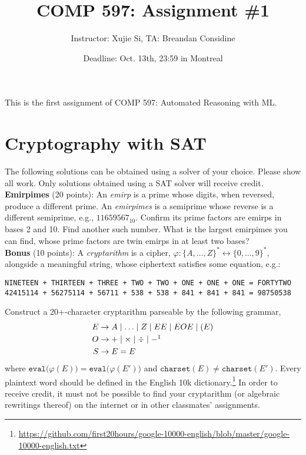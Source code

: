 \documentclass[11pt]{article}
\author{Instructor: Xujie Si, TA: Breandan Considine}
\date{Deadline: Oct. 13th, 23:59 in Montreal}
\title{COMP 597: Assignment \#1}
\begin{document}
    \maketitle
    \noindent This is the first assignment of COMP 597: Automated Reasoning with ML.

    \section{Cryptography with SAT}

    The following solutions can be obtained using a solver of your choice. Please show all work. Only solutions obtained using a SAT solver will receive credit.\\

    \noindent \textbf{Emirpimes} (20 points): An \textit{emirp} is a prime whose digits, when reversed, produce a different prime. An \textit{emirpimes} is a semiprime whose reverse is a different semiprime, e.g., $11659567_{10}$. Confirm its prime factors are emirps in bases 2 and 10. Find another such number. What is the largest emirpimes you can find, whose prime factors are twin emirps in at least two bases?\\

    \noindent \textbf{Bonus} (10 points): A \textit{cryptarithm} is a cipher, $\varphi: \{A,\ldots, Z\}^*\leftrightarrow \{0, \ldots, 9\}^*$, alongside a meaningful string, whose ciphertext satisfies some equation, e.g.:

    \begin{lstlisting}[basicstyle=\scriptsize\ttfamily]
NINETEEN + THIRTEEN + THREE + TWO + TWO + ONE + ONE + ONE = FORTYTWO
42415114 + 56275114 + 56711 + 538 + 538 + 841 + 841 + 841 = 98750538
    \end{lstlisting}

    \noindent Construct a 20+-character cryptarithm parseable by the following grammar,
    \begin{align*}
E &\rightarrow A \mid \ldots \mid Z \mid EE \mid E O E \mid ( E )\\
O &\rightarrow + \mid \times \mid \div \mid -\footnotemark\\
S &\rightarrow E = E
    \end{align*}
    \noindent where $\texttt{eval}\big(\varphi(E)\big) = \texttt{eval}\big(\varphi(E')\big)$ and $\texttt{charset}(E) \neq \texttt{charset}(E')$. Every plaintext word should be defined in the English 10k dictionary.\footnote{\tiny\url{https://github.com/first20hours/google-10000-english/blob/master/google-10000-english.txt}} In order to receive credit, it must not be possible to find your cryptarithm (or algebraic rewritings thereof) on the internet or in other classmates' assignments.\\
\end{document}
